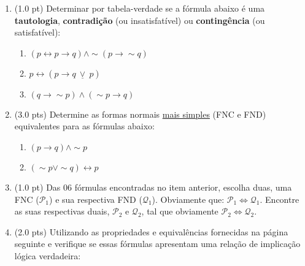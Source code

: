 \documentclass[12pt]{article}
\begin{document}
\begin{enumerate}
\itemsep 15pt
\item (1.0 pt) Determinar por tabela-verdade se a fórmula abaixo é uma {\bf tautologia}, {\bf contradição} (ou insatisfatível) ou {\bf contingência} (ou satisfatível): 

\begin{enumerate}
\setlength{\itemsep}{-2pt}
\item $(p \leftrightarrow p \rightarrow q) \wedge \sim (p \rightarrow \sim q)$

\item $p \leftrightarrow (p \rightarrow q ~\underline{\vee}~ p)$

\item $ (q \rightarrow \sim p) \wedge (\sim p \rightarrow  q) $ 


\end{enumerate}


\item (3.0 pts) Determine as formas normais \underline{mais simples} (FNC e FND) equivalentes para as fórmulas abaixo: 
\begin{enumerate}
\setlength{\itemsep}{-2pt}

\item $(p \rightarrow q)  \wedge  \sim p $


\item $(\sim p \vee \sim q) \leftrightarrow p $

\end{enumerate}

\item (1.0 pt) Das 06 fórmulas
encontradas no item anterior, escolha duas, uma 
FNC ($\mathcal{P}_1$) e sua respectiva FND ($\mathcal{Q}_1$). Obviamente que: $\mathcal{P}_1 \Leftrightarrow \mathcal{Q}_1$. 
Encontre as suas respectivas duais,
$\mathcal{P}_2$ e $\mathcal{Q}_2$,  tal que obviamente 
$\mathcal{P}_2 \Leftrightarrow \mathcal{Q}_2$.


\item (2.0 pts) Utilizando as propriedades e equivalências
fornecidas na página seguinte
e verifique  se essas fórmulas apresentam uma relaç\~ao de implicaç\~ao lógica  verdadeira:

\begin{enumerate}
\setlength{\itemsep}{-2pt}


\end{enumerate}
\end{enumerate}
\end{document}
